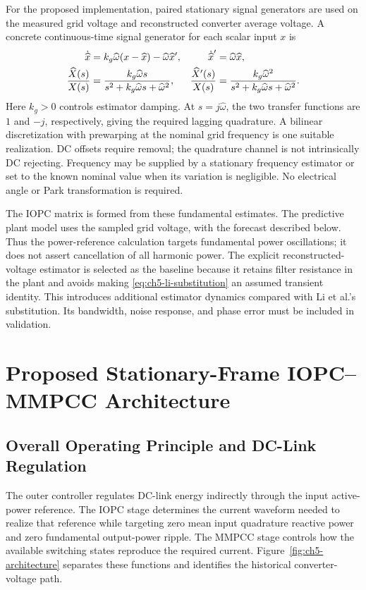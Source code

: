For the proposed implementation, paired stationary signal generators are used on the measured grid voltage and reconstructed converter average voltage. A concrete continuous-time signal generator for each scalar input $x$ is
\begin{align}
\dot{\widehat x}&=k_g\widehat\omega(x-\widehat x)-\widehat\omega\widehat x',&
\dot{\widehat x}'&=\widehat\omega\widehat x,\notag\\
\frac{\widehat X(s)}{X(s)}&=\frac{k_g\widehat\omega s}{s^2+k_g\widehat\omega s+\widehat\omega^2},&
\frac{\widehat X'(s)}{X(s)}&=\frac{k_g\widehat\omega^2}{s^2+k_g\widehat\omega s+\widehat\omega^2}.
\label{eq:ch5-qsg}
\end{align}
Here $k_g>0$ controls estimator damping. At $s=j\widehat\omega$, the two transfer functions are $1$ and $-j$, respectively, giving the required lagging quadrature. A bilinear discretization with prewarping at the nominal grid frequency is one suitable realization. DC offsets require removal; the quadrature channel is not intrinsically DC rejecting. Frequency may be supplied by a stationary frequency estimator or set to the known nominal value when its variation is negligible. No electrical angle or Park transformation is required.

The IOPC matrix is formed from these fundamental estimates. The predictive plant model uses the sampled grid voltage, with the forecast described below. Thus the power-reference calculation targets fundamental power oscillations; it does not assert cancellation of all harmonic power. The explicit reconstructed-voltage estimator is selected as the baseline because it retains filter resistance in the plant and avoids making \eqref{eq:ch5-li-substitution} an assumed transient identity. This introduces additional estimator dynamics compared with Li et al.'s substitution. Its bandwidth, noise response, and phase error must be included in validation.

\section{Proposed Stationary-Frame IOPC--MMPCC Architecture}
\label{sec:ch5-architecture}
\subsection{Overall Operating Principle and DC-Link Regulation}
The outer controller regulates DC-link energy indirectly through the input active-power reference. The IOPC stage determines the current waveform needed to realize that reference while targeting zero mean input quadrature reactive power and zero fundamental output-power ripple. The MMPCC stage controls how the available switching states reproduce the required current. Figure~\ref{fig:ch5-architecture} separates these functions and identifies the historical converter-voltage path.

